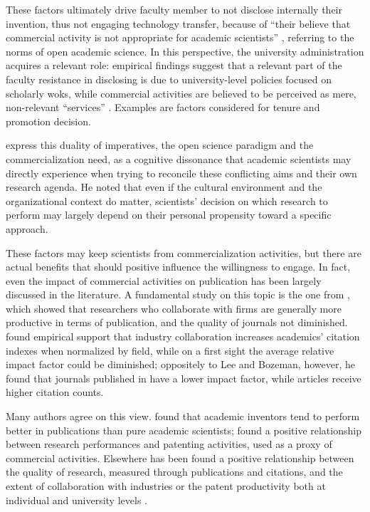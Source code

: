 These factors ultimately drive faculty member to not disclose internally their invention, thus not engaging technology transfer, because of \enquote{their believe that commercial activity is not appropriate for academic scientists} \citep{Bercovitz2006}, referring to the norms of open academic science.  In this perspective, the university administration acquires a relevant role: empirical findings suggest that a relevant part of the faculty resistance in disclosing is due to university-level policies focused on scholarly woks, while commercial activities are believed to be perceived as mere, non-relevant \enquote{services} \citep{Markman2005}. Examples are factors considered for tenure and promotion decision.

\citet{Muscio2013} express this duality of imperatives, the open science paradigm and the commercialization need, as a cognitive dissonance that academic scientists may directly experience when trying to reconcile these conflicting aims and their own research agenda. He noted that even if the cultural environment and the organizational context do matter, scientists' decision on which research to perform may largely depend on their personal propensity toward a specific approach.

These factors may keep scientists from commercialization activities, but there are actual benefits that should positive influence the willingness to engage. In fact, even the impact of commercial activities on publication has been largely discussed in the literature. A fundamental study on this topic is the one from \citet{Lee2005}, which showed that researchers who collaborate with firms are generally more productive in terms of publication, and the quality of journals not diminished. \citet{Lebeau2008} found empirical support that industry collaboration increases academics' citation indexes when normalized by field, while on a first sight the average relative impact factor could be diminished; oppositely to Lee and Bozeman, however, he found that journals published in have a lower impact factor, while articles receive higher citation counts.

Many authors agree on this view. \citet{Meyer2006} found that academic inventors tend to perform better in publications than pure academic scientists; \citet{Wong2010} found a positive relationship between research performances and patenting activities, used as a proxy of commercial activities. Elsewhere has been found a positive relationship between the quality of research, measured through publications and citations, and the extent of collaboration with industries \citep{AzagraCaro2010} or the patent productivity both at individual and university levels \citep{Baldini2007}.


